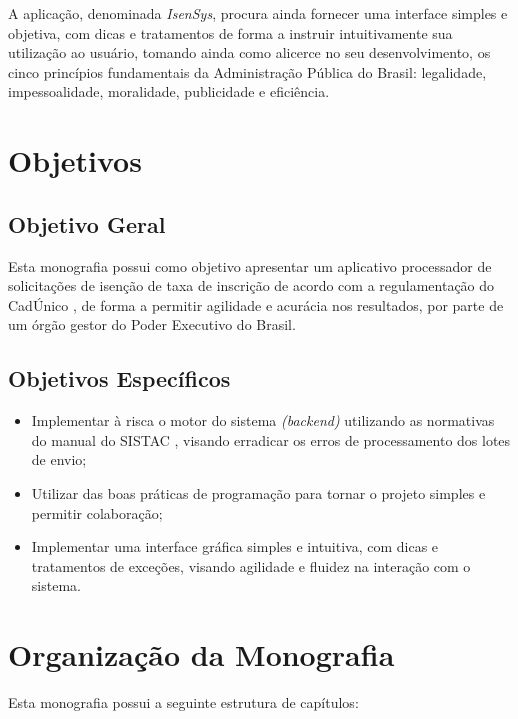 \documentclass[
	12pt,			%
	openright,		%
	oneside,	
	a4paper,		%
	english,		%
	brazil			%
]{abntex2/abntex2}  %
\begin{document}
		A aplicação, denominada \textit{IsenSys}, procura ainda fornecer uma interface simples e objetiva, com dicas e tratamentos de forma a instruir intuitivamente sua utilização ao usuário, tomando ainda como alicerce no seu desenvolvimento, os cinco princípios fundamentais da Administração Pública do Brasil: legalidade, impessoalidade, moralidade, publicidade e eficiência.

		\section{Objetivos}
		
			\subsection{Objetivo Geral}
			
			Esta monografia possui como objetivo apresentar um aplicativo processador de solicitações de isenção de taxa de inscrição de acordo com a regulamentação do CadÚnico \cite{cadunico-decreto}, de forma a permitir agilidade e acurácia nos resultados, por parte de um órgão gestor do Poder Executivo do Brasil.
			
			\subsection{Objetivos Específicos}
			
			\begin{itemize}
				
				\item Implementar à risca o motor do sistema \textit{(backend)} utilizando as normativas do manual do SISTAC \cite{sistac-formatos}, visando erradicar os erros de processamento dos lotes de envio;
				\item Utilizar das boas práticas de programação para tornar o projeto simples e permitir colaboração;
				\item Implementar uma interface gráfica simples e intuitiva, com dicas e tratamentos de exceções, visando agilidade e fluidez na interação com o sistema.
				
			\end{itemize}
		
		\section{Organização da Monografia}
		
			Esta monografia possui a seguinte estrutura de capítulos:
			
\end{document}
